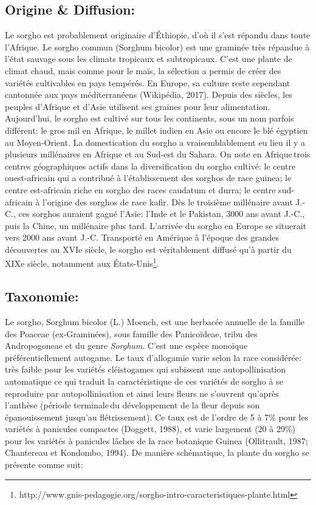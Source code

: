 \documentclass[a4paper,11pt]{article}
\begin{document}
  
\subsection{Origine \& Diffusion:}
Le sorgho est probablement originaire d’Éthiopie, d’où il s’est
répandu dans toute l’Afrique. Le sorgho commun (Sorghum bicolor) est
une graminée très répandue à l’état sauvage sous les climats tropicaux
et subtropicaux. C’est une plante de climat chaud, mais comme pour le
maïs, la sélection a permis de créer des variétés cultivables en pays
tempérés. En Europe, sa culture reste cependant cantonnée aux pays
méditerranéens (Wikipédia, 2017). Depuis des siècles, les peuples
d’Afrique et d’Asie utilisent ses graines pour leur
alimentation. Aujourd’hui, le sorgho est cultivé sur tous les
continents, sous un nom parfois différent: le gros mil en Afrique, le
millet indien en Asie ou encore le blé égyptien au Moyen-Orient. La
domestication du sorgho a vraisemblablement eu lieu il y a plusieurs
millénaires en Afrique et au Sud-est du Sahara.  On note en
Afrique\,trois centres géographiques actifs dans la diversification du
sorgho cultivé: le centre ouest-africain qui a contribué à
l’établissement des sorghos de race guinea; le centre est-africain
riche en sorgho des races caudatum et durra; le centre sud-africain à
l’origine des sorghos de race kafir. Dès le troisième millénaire
avant J.-C., ces sorghos auraient gagné l’Asie: l’Inde et le Pakistan,
3000 ans avant J.-C., puis la Chine, un millénaire plus
tard. L’arrivée du sorgho en Europe se situerait vers 2000 ans avant
J.-C. Transporté en Amérique à l’époque des grandes découvertes au
XVIe siècle, le sorgho est véritablement diffusé qu’à partir du XIXe
siècle, notamment aux
États-Unis\footnote{http://www.gnis-pedagogie.org/sorgho-intro-caracteristiques-plante.html}.

\subsection{Taxonomie:}
Le sorgho, Sorghum bicolor (L.) Moench, est une herbacée annuelle de
la famille des Poaceae (ex-Graminées), sous famille des Panicoïdeae,
tribu des Andropogoneae et du genre \emph{Sorghum}\cite{Doggett_1988}.
C’est une espèce monoïque préférentiellement
autogame. Le taux d’allogamie varie selon la race considérée: très
faible pour les variétés cléistogames qui subissent une
autopollinisation automatique ce qui traduit la caractéristique de ces
variétés de sorgho à se reproduire par autopollinisation et ainsi
leurs fleurs ne s’ouvrent qu’après l’anthèse (période terminale\,du
développement de la fleur depuis son épanouissement jusqu’au
flétrissement). Ce taux est de l’ordre de 5 à 7\% pour les variétés à
panicules compactes (Doggett, 1988), et varie largement (20 à 29\%)
pour les variétés à panicules lâches de la race botanique Guinea
(Ollitrault, 1987; Chantereau et Kondombo, 1994). De manière
schématique, la plante du sorgho se présente comme suit:
\end{document}
